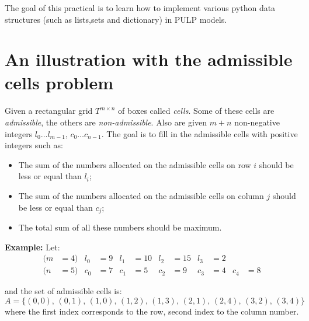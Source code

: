 \documentclass[a4paper, 12pt]{article}
\begin{document}





The goal of this practical is to learn how to implement various python data structures (such as lists,sets and dictionary) in PULP models. 

\section{An illustration with the admissible cells problem}

\paragraph{} Given a rectangular grid \(T^{m \times n}\) of boxes called \emph{cells}. Some of these cells are \emph{admissible}, the others are \emph{non-admissible}. Also are given \(m+n\) non-negative integers \(l_0 \ldots l_{m-1}\), \(c_0 \ldots c_{n-1}\). The goal is to fill in the admissible cells with positive integers such as:

\begin{itemize}[label=---]\itemsep=0em
  \item The sum of the numbers allocated on the admissible cells on row \(i\) should be less or equal than \(l_i\);
  \item The sum of the numbers allocated on the admissible cells on column \(j\) should be less or equal than \(c_j\);
  \item The total sum of all these numbers should be maximum.
\end{itemize}

\phantom{}

\noindent \textbf{Example:} Let:
\begin{align*}
  (m & = 4) & l_0 & =9 & l_1 & =10 & l_2 & =15 & l_3 & =2 &     &    \\
  (n & = 5) & c_0 & =7 & c_1 & =5  & c_2 & =9  & c_3 & =4 & c_4 & =8
\end{align*}

\indent and the set of admissible cells is:
\[
  A=\{(0,0),\, (0,1),\, (1,0),\, (1,2),\, (1,3),\, (2,1),\, (2,4),\, (3,2),\, (3,4)\}
\]
\indent where the first index corresponds to the row, second index to the column number.
\end{document}
